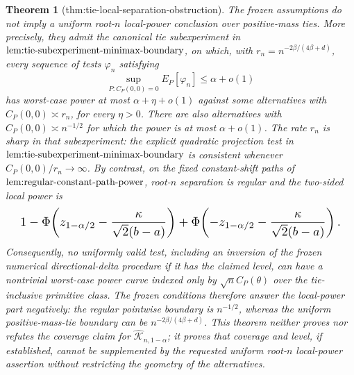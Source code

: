 \documentclass{article}
\newtheorem{theorem}{Theorem}
\begin{document}
\begin{theorem}[thm:tie-local-separation-obstruction]\label{thm:tie-local-separation-obstruction}
The frozen assumptions do not imply a uniform root-\(n\) local-power conclusion over positive-mass ties. More precisely, they admit the canonical tie subexperiment in \(\textup{lem:tie-subexperiment-minimax-boundary}\), on which, with \(r_n=n^{-2\beta/(4\beta+d)}\), every sequence of tests \(\varphi_n\) satisfying \[\sup_{P:C_P(0,0)=0}E_P[\varphi_n]\le\alpha+o(1)\]has worst-case power at most \(\alpha+\eta+o(1)\) against some alternatives with \(C_P(0,0)\asymp r_n\), for every \(\eta>0\). There are also alternatives with \(C_P(0,0)\asymp n^{-1/2}\) for which the power is at most \(\alpha+o(1)\). The rate \(r_n\) is sharp in that subexperiment: the explicit quadratic projection test in \(\textup{lem:tie-subexperiment-minimax-boundary}\) is consistent whenever \(C_P(0,0)/r_n\to\infty\). By contrast, on the fixed constant-shift paths of \(\textup{lem:regular-constant-path-power}\), root-\(n\) separation is regular and the two-sided local power is \[
\makebox[\linewidth][c]{\resizebox{0.98\linewidth}{!}{\par\noindent \makebox[\linewidth][c]{\resizebox{0.98\linewidth}{!}{\(\displaystyle \displaystyle 1-\Phi\!\left(z_{1-\alpha/2}-\frac{\kappa}{\sqrt{2}(b-a)}\right)+\Phi\!\left(-z_{1-\alpha/2}-\frac{\kappa}{\sqrt{2}(b-a)}\right).\)}}\par\noindent}}
\]Consequently, no uniformly valid test, including an inversion of the frozen numerical directional-delta procedure if it has the claimed level, can have a nontrivial worst-case power curve indexed only by \(\sqrt n C_P(\theta)\) over the tie-inclusive primitive class. The frozen conditions therefore answer the local-power part negatively: the regular pointwise boundary is \(n^{-1/2}\), whereas the uniform positive-mass-tie boundary can be \(n^{-2\beta/(4\beta+d)}\). This theorem neither proves nor refutes the coverage claim for \(\widehat{\mathcal K}_{n,1-\alpha}\); it proves that coverage and level, if established, cannot be supplemented by the requested uniform root-\(n\) local-power assertion without restricting the geometry of the alternatives.
\end{theorem}
\end{document}
